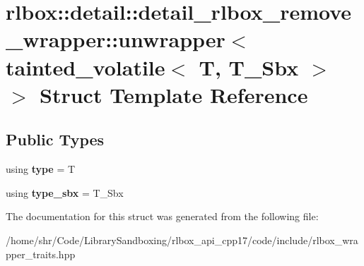 \hypertarget{structrlbox_1_1detail_1_1detail__rlbox__remove__wrapper_1_1unwrapper_3_01tainted__volatile_3_01T_00_01T__Sbx_01_4_01_4}{}\section{rlbox\+:\+:detail\+:\+:detail\+\_\+rlbox\+\_\+remove\+\_\+wrapper\+:\+:unwrapper$<$ tainted\+\_\+volatile$<$ T, T\+\_\+\+Sbx $>$ $>$ Struct Template Reference}
\label{structrlbox_1_1detail_1_1detail__rlbox__remove__wrapper_1_1unwrapper_3_01tainted__volatile_3_01T_00_01T__Sbx_01_4_01_4}
\subsection*{Public Types}
\begin{DoxyCompactItemize}
\item 
\mbox{\label{structrlbox_1_1detail_1_1detail__rlbox__remove__wrapper_1_1unwrapper_3_01tainted__volatile_3_01T_00_01T__Sbx_01_4_01_4_a35e2bbef854da26ac6183d86973088d1}} 
using {\bfseries type} = T
\item 
\mbox{\label{structrlbox_1_1detail_1_1detail__rlbox__remove__wrapper_1_1unwrapper_3_01tainted__volatile_3_01T_00_01T__Sbx_01_4_01_4_a03486bcca1d3277cdfab50c85839b595}} 
using {\bfseries type\+\_\+sbx} = T\+\_\+\+Sbx
\end{DoxyCompactItemize}


The documentation for this struct was generated from the following file\+:\begin{DoxyCompactItemize}
\item 
/home/shr/\+Code/\+Library\+Sandboxing/rlbox\+\_\+api\+\_\+cpp17/code/include/rlbox\+\_\+wrapper\+\_\+traits.\+hpp\end{DoxyCompactItemize}
